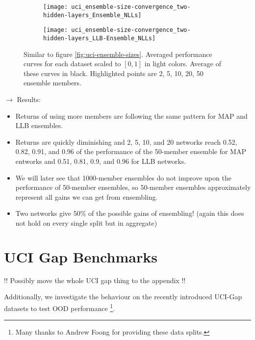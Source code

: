 \documentclass[../thesis.tex]{subfiles}
\begin{document}
\begin{figure}
    \centering
    \begin{subfigure}{\textwidth}
    \texttt{[image: uci\_ensemble-size-convergence\_two-hidden-layers\_Ensemble\_NLLs]} 
    \end{subfigure}
    \begin{subfigure}{\textwidth}
    \texttt{[image: uci\_ensemble-size-convergence\_two-hidden-layers\_LLB-Ensemble\_NLLs]} 
    \end{subfigure}
    \caption{Similar to figure \ref{fig:uci-ensemble-sizes}. Averaged performance curves for each dataset scaled to $[0, 1]$ in light colors. Average of these curves in black. Highlighted points are 2, 5, 10, 20, 50 ensemble members. }
    \label{fig:uci-ensemble-sizes-alternative}
    
\end{figure}

\bigskip

$\rightarrow$ Results:
\begin{itemize}
    \item Returns of using more members are following the same pattern for MAP and LLB ensembles.
    \item Returns are quickly diminishing and 2, 5, 10, and 20 networks reach 0.52, 0.82, 0.91, and 0.96 of the performance of the 50-member ensemble for MAP entworks and 0.51, 0.81, 0.9, and 0.96 for LLB networks. 
    \item We will later see that 1000-member ensembles do not improve upon the performance of 50-member ensembles, so 50-member ensembles approximately represent all gains we can get from ensembling.
    \item Two networks give 50\% of the possible gains of ensembling! (again this does not hold on every single split but in aggregate)
\end{itemize}


\section{UCI Gap Benchmarks}
!! Possibly move the whole UCI gap thing to the appendix !!

Additionally, we investigate the behaviour on the recently introduced UCI-Gap datasets to test OOD performance \parencite{foong2019between}\footnote{Many thanks to Andrew Foong for providing these data splits.}. 
\bigskip
\end{document}
